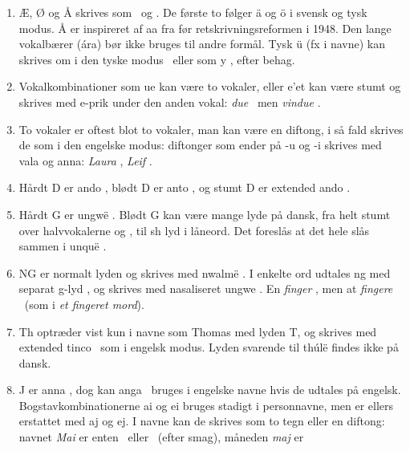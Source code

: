 \documentclass[a4paper]{article}
\begin{document}
\begin{enumerate}
\item Æ, Ø og Å skrives som \Ttelco\TTinvertedthreedots\Ts
  \Ttelco\TTdoubleacute ~og \Taara\TTthreedots.  De første to følger
  \"a og \"o i svensk og tysk modus.  Å er inspireret af aa fra før
  retskrivningsreformen i 1948.  Den lange vokalbærer (\'ara) bør ikke
  bruges til andre formål.  Tysk \"u (fx i navne) kan skrives om i den
  tyske modus  \Ttelco\TTtwodots ~eller som y \Ttelco\TTbreve, efter
  behag.
\item Vokalkombinationer som ue kan være to vokaler, eller e'et kan
  være stumt og skrives med e-prik under den anden vokal: \emph{due}
  \Tando\Ttelco\TTleftcurl\Ttelco\TTacute ~men \emph{vindue}
  \Tampa\Tando\TTnasalizer\TTdot\Ttelco\TTleftcurl\TTdotbelow.
\item To vokaler er oftest blot to vokaler, man kan være en diftong, i
  så fald skrives de som i den engelske modus: diftonger som ender på
  -u og -i skrives med vala og anna: \emph{Laura}
  \Tlambe\Tvala\TTthreedots\Troomen\Ttelco\TTthreedots, \emph{Leif}
  \Tlambe\Tanna\TTacute\Tformen.
\item Hårdt D er ando \Tando, blødt D er anto \Tanto, og stumt D er
  extended ando \Textendedando.
\item Hårdt G er ungw\"e \Tungwe.  Blødt G kan være mange lyde på
  dansk, fra helt stumt over halvvokalerne \textipa{[I]} og
  \textipa{[U]}, til sh lyd \textipa{[S]} i låneord.  Det foreslås at
  det hele slås sammen i unqu\"e \Tunque.
\item NG er normalt lyden \textipa{[N]} og skrives med nwalm\"e
  \Tnwalme.  I enkelte ord udtales ng med separat g-lyd \textipa{[Ng]}, og skrives med
  nasaliseret ungwe \Tungwe\TTnasalizer.  En \emph{finger}
  \Tformen\Tnwalme\TTdot\Toore\TTacute, men at \emph{fingere}
  \Tformen\Tungwe\TTnasalizer\TTdot\Troomen\TTacute\Ttelco\TTacute
  ~(som i \emph{et fingeret mord}).
\item Th optræder vist kun i navne som Thomas med lyden T, og skrives
  med extended tinco \Textendedtinco ~som i engelsk modus.  Lyden
  svarende til th\'ul\"e \textipa{[T]} findes ikke på dansk.
\item J er anna \Tanna, dog kan anga \Tanga ~bruges i engelske navne
  hvis de udtales på engelsk.  Bogstavkombinationerne ai og ei bruges
  stadigt i personnavne, men er ellers erstattet med aj og ej.  I
  navne kan de skrives som to tegn eller en diftong: navnet \emph{Mai}
  er enten \Tmalta\Ttelco\TTthreedots\Ttelco\TTdot ~eller
  \Tmalta\Tanna\TTdot ~(efter smag), måneden \emph{maj} er

\end{enumerate}
\end{document}
